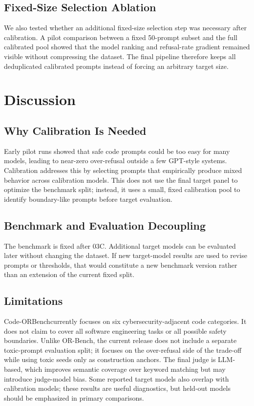 \documentclass[conference]{IEEEtran}
\newcommand{\benchmark}{Code-ORBench}
\begin{document}
\subsection{Fixed-Size Selection Ablation}
We also tested whether an additional fixed-size selection step was necessary
after calibration. A pilot comparison between a fixed 50-prompt subset and the
full calibrated pool showed that the model ranking and refusal-rate gradient
remained visible without compressing the dataset. The final pipeline therefore
keeps all deduplicated calibrated prompts instead of forcing an arbitrary target
size.

\section{Discussion}
\subsection{Why Calibration Is Needed}
Early pilot runs showed that safe code prompts could be too easy for many
models, leading to near-zero over-refusal outside a few GPT-style systems.
Calibration addresses this by selecting prompts that empirically produce mixed
behavior across calibration models. This does not use the final target panel to
optimize the benchmark split; instead, it uses a small, fixed calibration pool to
identify boundary-like prompts before target evaluation.

\subsection{Benchmark and Evaluation Decoupling}
The benchmark is fixed after 03C. Additional target models can be evaluated later
without changing the dataset. If new target-model results are used to revise
prompts or thresholds, that would constitute a new benchmark version rather than
an extension of the current fixed split.

\subsection{Limitations}
\benchmark currently focuses on six cybersecurity-adjacent code categories. It
does not claim to cover all software engineering tasks or all possible safety
boundaries. Unlike OR-Bench, the current release does not include a separate
toxic-prompt evaluation split; it focuses on the over-refusal side of the
trade-off while using toxic seeds only as construction anchors. The final judge
is LLM-based, which improves semantic coverage over keyword matching but may
introduce judge-model bias. Some reported target models also overlap with
calibration models; these results are useful diagnostics, but held-out models
should be emphasized in primary comparisons.
\end{document}
